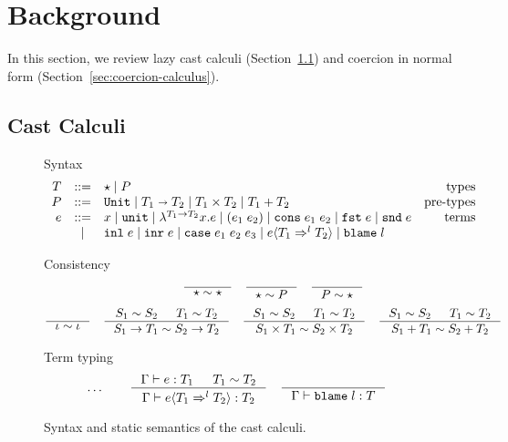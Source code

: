 \documentclass[acmsmall,review,anonymous]{acmart}\settopmatter{printfolios=true,printccs=false,printacmref=false}
\newcommand{\stxrule}[3]{#1 & ::= & #3 & \text{#2}\\}
\newcommand{\stxrulecont}[1]{& | & #1 & \\}
\newcommand{\plus}[0]{+}
\newcommand{\judgetype}[3]{#1 \vdash #2 : #3}
\newcommand{\POOunit}[0]{\mathtt{Unit}}
\newcommand{\POOfun}[2]{#1 \shortrightarrow #2}
\newcommand{\POOprod}[2]{#1 \times #2}
\newcommand{\POOsum}[2]{#1 \plus #2}
\newcommand{\eOOvar}[1]{#1}
\newcommand{\eOOsole}[0]{\mathtt{unit}}
\newcommand{\eOOlam}[4]{\lambda^{#1\rightarrow{}#2}#3.#4}
\newcommand{\eOOapp}[2]{(#1 \; #2)}
\newcommand{\eOOcons}[2]{\mathtt{cons} \; #1 \; #2}
\newcommand{\eOOcar}[1]{\mathtt{fst} \; #1}
\newcommand{\eOOcdr}[1]{\mathtt{snd} \; #1}
\newcommand{\eOOinl}[1]{\mathtt{inl} \; #1}
\newcommand{\eOOinr}[1]{\mathtt{inr} \; #1}
\newcommand{\eOOcase}[3]{\mathtt{case} \; #1 \; #2 \; #3}
\newcommand{\eOOcast}[4]{#1 \langle \cOOcast{#2}{#3}{#4} \rangle}
\newcommand{\eOOblame}[1]{\mathtt{blame} \; #1}
\newcommand{\cOOcast}[3]{#1 \Rightarrow^{#2} #3}
\begin{document}
\section{Background} \label{sec:background}

In this section, we review lazy cast calculi
(Section~\ref{sec:cast-calculi}) and coercion in normal form
(Section~\ref{sec:coercion-calculus}).

\subsection{Cast Calculi}
\label{sec:cast-calculi}

\begin{figure}
  Syntax
  \[
  \begin{array}{rclr}
  \stxrule{T}{types}{
    \star \mid{}
    P
  }
  \stxrule{P}{pre-types}{
    \POOunit \mid
    \POOfun{T_1}{T_2} \mid
    \POOprod{T_1}{T_2} \mid
    \POOsum{T_1}{T_2}
  }
  \stxrule{e}{terms}{
    \eOOvar{x} \mid{}
    \eOOsole{} \mid{}
    \eOOlam{T_1}{T_2}{x}{e} \mid
    \eOOapp{e_1}{e_2} \mid
    \eOOcons{e_1}{e_2} \mid
    \eOOcar{e} \mid
    \eOOcdr{e}
  }
  \stxrulecont{
    \eOOinl{e} \mid
    \eOOinr{e} \mid
    \eOOcase{e_1}{e_2}{e_3} \mid
    \eOOcast{e}{T_1}{l}{T_2} \mid
    \eOOblame{l}
  }
  \end{array}
  \]
  
  Consistency
  \begin{gather*}
  \inference{}{
    \star \sim \star
  } \quad
  \inference{}{
    \star \sim P
  } \quad
  \inference{}{
    P \sim \star
  } \\[1ex]
  \inference{}{
    \iota \sim \iota
  } \quad
  \inference{
    S_1 \sim S_2 &
    T_1 \sim T_2
  }{
    S_1 \rightarrow T_1 \sim S_2 \rightarrow T_2
  } \quad
  \inference{
    S_1 \sim S_2 &
    T_1 \sim T_2
  }{
    S_1 \times T_1 \sim S_2 \times T_2
  } \quad
  \inference{
    S_1 \sim S_2 &
    T_1 \sim T_2
  }{
    S_1 \plus T_1 \sim S_2 \plus T_2
  }
  \end{gather*}
  
  Term typing
  \fbox{$\judgetype{\Gamma}{e}{T}$}
  \begin{gather*}
          \dots \qquad
    \inference{
      \Gamma \vdash e : T_1 & T_1 \sim T_2
    }{
      \judgetype{\Gamma}{\eOOcast{e}{T_1}{l}{T_2}}{T_2}
    } \quad
    \inference{
    }{
      \judgetype{\Gamma}{\eOOblame{l}}{T}
    }
  \end{gather*}
  
  \caption{Syntax and static semantics of the cast calculi.}
  \label{fig:blame-static}
\end{figure}
\end{document}
